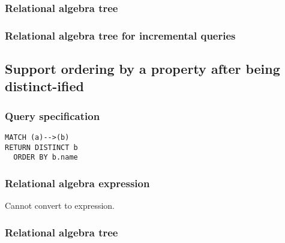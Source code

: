 \subsubsection*{Relational algebra tree}


\subsubsection*{Relational algebra tree for incremental queries}


\subsection{Support ordering by a property after being distinct-ified}

\subsubsection*{Query specification}

\begin{lstlisting}
MATCH (a)-->(b)
RETURN DISTINCT b
  ORDER BY b.name
\end{lstlisting}

\subsubsection*{Relational algebra expression}

Cannot convert to expression.

\subsubsection*{Relational algebra tree}

